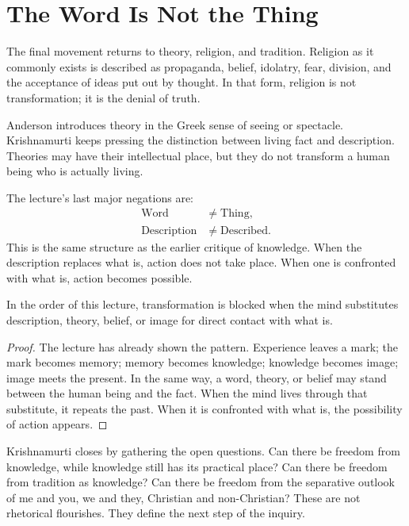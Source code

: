\section{The Word Is Not the Thing}

The final movement returns to theory, religion, and tradition. Religion as it commonly exists is described as propaganda, belief, idolatry, fear, division, and the acceptance of ideas put out by thought. In that form, religion is not transformation; it is the denial of truth.

Anderson introduces theory in the Greek sense of seeing or spectacle. Krishnamurti keeps pressing the distinction between living fact and description. Theories may have their intellectual place, but they do not transform a human being who is actually living.

The lecture's last major negations are:
\begin{align}
\mathrm{Word} &\ne \mathrm{Thing},\\
\mathrm{Description} &\ne \mathrm{Described}.
\end{align}
This is the same structure as the earlier critique of knowledge. When the description replaces what is, action does not take place. When one is confronted with what is, action becomes possible.

\begin{proposition}
In the order of this lecture, transformation is blocked when the mind substitutes description, theory, belief, or image for direct contact with what is.
\end{proposition}

\begin{proof}
The lecture has already shown the pattern. Experience leaves a mark; the mark becomes memory; memory becomes knowledge; knowledge becomes image; image meets the present. In the same way, a word, theory, or belief may stand between the human being and the fact. When the mind lives through that substitute, it repeats the past. When it is confronted with what is, the possibility of action appears.
\end{proof}

Krishnamurti closes by gathering the open questions. Can there be freedom from knowledge, while knowledge still has its practical place? Can there be freedom from tradition as knowledge? Can there be freedom from the separative outlook of me and you, we and they, Christian and non-Christian? These are not rhetorical flourishes. They define the next step of the inquiry.


